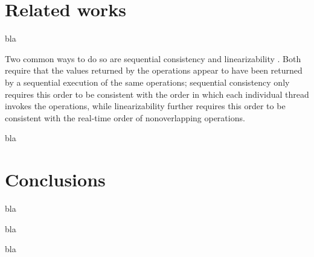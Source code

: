 \documentclass[a4paper,10pt]{article} %
\begin{document}
\section{Related works}

bla

Two common ways to do so are sequential consistency
\cite{lamport1979make} and linearizability \cite{herlihy1990linearizability}. Both require that
the values returned by the operations appear to have
been returned by a sequential execution of the same
operations; sequential consistency only requires this
order to be consistent with the order in which each
individual thread invokes the operations, while linearizability
further requires this order to be consistent
with the real-time order of nonoverlapping operations.

bla

\section{Conclusions}

bla

bla

bla


\end{document}
